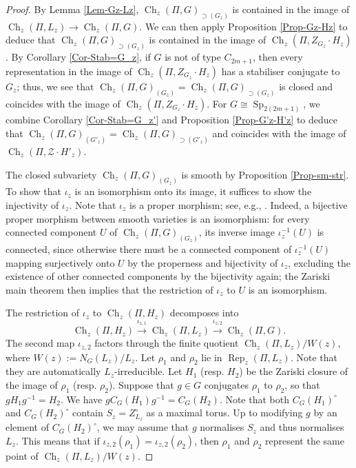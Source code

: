 \documentclass[11pt,oneside,dvipsnames]{amsart}
\theoremstyle{plain}
\theoremstyle{definition}
\theoremstyle{named}
\DeclareMathOperator{\Ch}{Ch}
\DeclareMathOperator{\Rep}{Rep}
\DeclareMathOperator{\Sp}{Sp}
\begin{document}
\begin{proof}
By Lemma \ref{Lem-Gz-Lz}, $\Ch_z(\Pi,G)_{\supset(G_z)}$ is contained in the image of $\Ch_z(\Pi,L_z)\rightarrow\Ch_z(\Pi,G)$. We can then apply Proposition \ref{Prop-Gz-Hz} to deduce that $\Ch_z(\Pi,G)_{\supset(G_z)}$ is contained in the image of $\Ch_z(\Pi,Z_{G_z}\cdot H_z)$.  By Corollary \ref{Cor-Stab=G_z}, if $G$ is not of type $C_{2m+1}$, then every representation in the image of $\Ch_z(\Pi,Z_{G_z}\cdot H_z)$ has a stabiliser conjugate to $G_z$; thus, we see that $\Ch_z(\Pi,G)_{(G_z)}=\Ch_z(\Pi,G)_{\supset(G_z)}$ is closed and coincides with the image of $\Ch_z(\Pi,Z_{G_z}\cdot H_z)$. For $G\cong\Sp_{2(2m+1)}$, we combine Corollary \ref{Cor-Stab=G_z'} and Proposition \ref{Prop-G'z-H'z} to deduce that $\Ch_z(\Pi,G)_{(G'_z)}=\Ch_z(\Pi,G)_{\supset(G'_z)}$ and coincides with the image of $\Ch_z(\Pi,\mathscr{Z}\cdot H'_z)$.

The closed subvariety $\Ch_z(\Pi,G)_{(G_z)}$ is smooth by Proposition \ref{Prop-sm-str}. To show that $\iota_z$ is an isomorphism onto its image, it suffices to show the injectivity of $\iota_z$. Note that $\iota_z$ is a proper morphism; see, e.g., \cite[\S 3.3]{Shu4}. Indeed, a bijective proper morphism between smooth varieties is an isomorphism: for every connected component $U$ of $\Ch_z(\Pi,G)_{(G_z)}$, its inverse image $\iota_z^{-1}(U)$ is connected, since otherwise there must be a connected component of $\iota_z^{-1}(U)$ mapping surjectively onto $U$ by the properness and bijectivity of $\iota_z$, excluding the existence of other connected components by the bijectivity again; the Zariski main theorem then implies that the restriction of $\iota_z$ to $U$ is an isomorphism.

The restriction of $\iota_z$ to $\Ch_z(\Pi,H_z)$ decomposes into
$$
\Ch_z(\Pi,H_z)\stackrel{\iota_{z,1}}{\longrightarrow}\Ch_z(\Pi,L_z)\stackrel{\iota_{z,2}}{\longrightarrow}\Ch_z(\Pi,G).
$$
The second map $\iota_{z,2}$ factors through the finite quotient $\Ch_z(\Pi,L_z)/W(z)$, where $W(z):=N_G(L_z)/L_z$. Let $\rho_1$ and $\rho_2$ lie in $\Rep_z(\Pi,L_z)$. Note that they are automatically $L_z$-irreducible. Let $H_1$ (resp. $H_2$) be the Zariski closure of the image of $\rho_1$ (resp. $\rho_2$). Suppose that $g\in G$ conjugates $\rho_1$ to $\rho_2$, so that $gH_1g^{-1}=H_2$. We have $gC_G(H_1)g^{-1}=C_G(H_2)$. Note that both $C_G(H_1)^{\circ}$ and $C_G(H_2)^{\circ}$ contain $S_z=Z_{L_z}^{\circ}$ as a maximal torus. Up to modifying $g$ by an element of $C_G(H_2)^{\circ}$, we may assume that $g$ normalises $S_z$ and thus normalises $L_z$. This means that if $\iota_{z,2}(\rho_1)=\iota_{z,2}(\rho_2)$, then $\rho_1$ and $\rho_2$ represent the same point of $\Ch_z(\Pi,L_z)/W(z)$. 


\end{proof}
\end{document}
